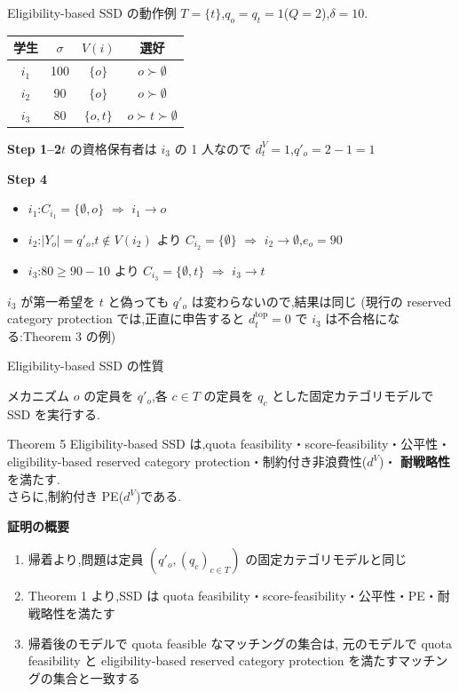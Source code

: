 \documentclass[aspectratio=43,11pt]{beamer}
\newcommand{\topf}{\mathrm{top}}
\newcommand{\dtop}[1]{d^{\topf}_{#1}}
\newcommand{\dV}[1]{d^{V}_{#1}}
\begin{document}
\begin{frame}{Eligibility-based SSD の動作例}
\small
$T = \{t\}$,$q_o = q_t = 1$($Q = 2$),$\delta = 10$.
\begin{center}
\renewcommand{\arraystretch}{1.1}
\begin{tabular}{cccc}
  \toprule
  学生 & $\sigma$ & $V(i)$ & 選好 \\
  \midrule
  $i_1$ & 100 & $\{o\}$ & $o \succ \emptyset$ \\
  $i_2$ & 90 & $\{o\}$ & $o \succ \emptyset$ \\
  $i_3$ & 80 & $\{o, t\}$ & $o \succ t \succ \emptyset$ \\
  \bottomrule
\end{tabular}
\end{center}
\textbf{Step 1--2}\quad $t$ の資格保有者は $i_3$ の 1 人なので $\dV{t} = 1$,$q'_o = 2 - 1 = 1$

\textbf{Step 4}
\begin{itemize}
  \item $i_1$:$C_{i_1} = \{\emptyset, o\}$ $\Rightarrow$ $i_1 \to o$
  \item $i_2$:$|Y_o| = q'_o$,$t \notin V(i_2)$ より $C_{i_2} = \{\emptyset\}$
        $\Rightarrow$ $i_2 \to \emptyset$,$e_o = 90$
  \item $i_3$:$80 \geq 90 - 10$ より $C_{i_3} = \{\emptyset, t\}$
        $\Rightarrow$ $i_3 \to t$
\end{itemize}
\medskip
\alert{$i_3$ が第一希望を $t$ と偽っても $q'_o$ は変わらないので,結果は同じ}
(現行の reserved category protection では,正直に申告すると $\dtop{t} = 0$ で $i_3$ は不合格になる:Theorem 3 の例)
\end{frame}

\begin{frame}{Eligibility-based SSD の性質}
\small
\begin{block}{メカニズム}
  $o$ の定員を $q'_o$,各 $c \in T$ の定員を $q_c$ とした固定カテゴリモデルで SSD を実行する.
\end{block}
\begin{block}{Theorem 5}
  Eligibility-based SSD は,quota feasibility・score-feasibility・公平性・
  eligibility-based reserved category protection・制約付き非浪費性($d^{V}$)・
  \textbf{耐戦略性}を満たす.\\
  さらに,\alert{制約付き PE($d^{V}$)}である.
\end{block}
\textbf{証明の概要}
\begin{enumerate}
  \item 帰着より,問題は定員 $(q'_o, (q_c)_{c\in T})$ の固定カテゴリモデルと同じ
  \item Theorem 1 より,SSD は quota feasibility・score-feasibility・公平性・PE・耐戦略性を満たす
  \item 帰着後のモデルで quota feasible なマッチングの集合は,
        元のモデルで quota feasibility と eligibility-based reserved category protection を満たすマッチングの集合と一致する
\end{enumerate}
\end{frame}
\end{document}
